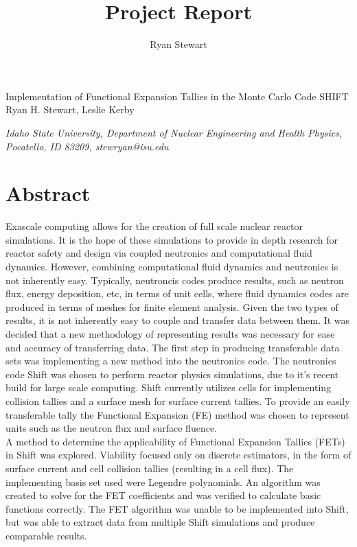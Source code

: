 \documentclass[10tma4paper]{article}
\title{Project Report}
\author{Ryan Stewart}
\begin{document}
	\begin{center}
		Implementation of Functional Expansion Tallies in the 
		Monte Carlo Code SHIFT
		\\
		\bigskip
		\small{Ryan H. Stewart, Leslie} Kerby
		\\
	\end{center}
	
	\begin{center}
		\textit{\small{Idaho State University, Department of Nuclear Engineering and Health Physics, Pocatello, ID 83209, stewryan@isu.edu}}
	\end{center}
	

\section{Abstract}\label{abstract}

Exascale computing allows for the creation of full scale nuclear reactor simulations. It is the hope of these simulations to provide in depth research for reactor safety and design via coupled neutronics and computational fluid dynamics. However, combining computational fluid dynamics and neutronics is not inherently easy. Typically, neutroncis codes produce results, such as neutron flux, energy deposition, etc, in terms of unit cells, where fluid dynamics codes are produced in terms of meshes for finite element analysis. Given the two types of results, it is not inherently easy to couple and transfer data between them. It was decided that a new methodology of representing results was necessary for ease and accuracy of transferring data. The first step in producing transferable data sets was implementing a new method into the neutronics code. The neutronics code Shift was chosen to perform reactor physics simulations, due to it's recent build for large scale computing. Shift currently utilizes cells for implementing collision tallies and a surface mesh for surface current tallies. To provide an easily transferable tally the Functional Expansion (FE) method was chosen to represent units such as the neutron flux and surface fluence. 
\\
A method to determine the applicability of Functional Expansion Tallies (FETs) in Shift was explored. Viability focused only on discrete estimators, in the form of surface current and cell collision tallies (resulting in a cell flux). The implementing basis set used were Legendre polynomials. An algorithm was created to solve for the FET coefficients and was verified to calculate basic functions correctly. The FET algorithm was unable to be implemented into Shift, but was able to extract data from multiple Shift simulations and produce comparable results.
\end{document}
